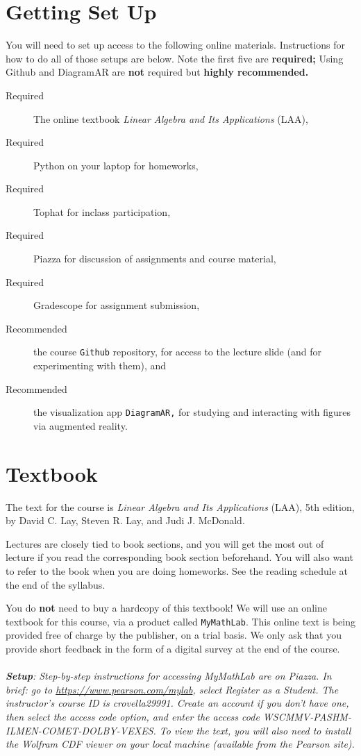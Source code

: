 \documentclass[11pt]{article}
\begin{document}
\section*{Getting Set Up}

You will need to set up access to the following online materials.
Instructions for how to do all of those setups are below.   Note the
first five are \textbf{required;}  Using Github and DiagramAR are
\textbf{not}  required but \textbf{highly recommended.}

\begin{description}
\item[Required] The online textbook \emph{Linear Algebra and Its
  Applications} (LAA),
\item[Required] Python on your laptop for homeworks, 
\item[Required] Tophat for inclass participation,
\item[Required] Piazza for discussion of assignments and course material,
\item[Required] Gradescope for assignment submission, 
\item[Recommended] the course \texttt{Github} repository, for access to
  the lecture slide (and for experimenting with them), and
\item[Recommended] the visualization app \texttt{DiagramAR,} for
  studying and interacting with figures via augmented reality.
\end{description}

\section*{Textbook} 

The text for the course is \emph{Linear Algebra and
  Its Applications} (LAA), 5th edition, by David C. Lay, Steven R. Lay,
and Judi J. McDonald.    

Lectures are closely tied to book sections, and you will get
the most out of lecture if you read the corresponding book section
beforehand.   You will also want to refer to the book when you are doing
homeworks.   See the reading schedule at the end of the syllabus.

You do \textbf{not} need to buy a hardcopy of this textbook!
We will use an online textbook for this course, via a product called
\texttt{MyMathLab}.   This online text is 
being provided free of charge by the publisher, on a trial basis.   We
only ask that you provide short feedback in the form of a digital
survey at the end of the course.
\\
~\\\emph{\textbf{Setup}: Step-by-step instructions for accessing MyMathLab are on
  Piazza.  In brief: go to \url{https://www.pearson.com/mylab}, select
  Register as a Student.   The instructor's course ID is crovella29991.
Create an account if you don't have one, then select the access code
option, and enter the access code WSCMMV-PASHM-ILMEN-COMET-DOLBY-VEXES.
To view the text, you will also need to install the Wolfram CDF viewer on
your local machine (available from the Pearson site).}
\end{document}
